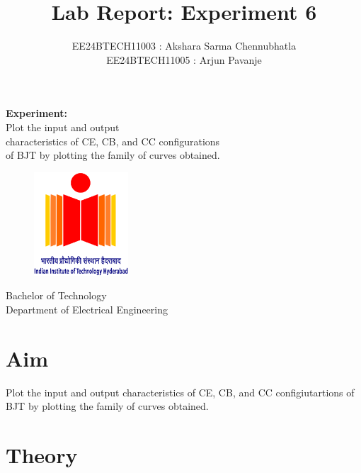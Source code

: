 \documentclass[12pt,a4paper]{article}
\title{\textbf{Lab Report: Experiment 6}}
\author{EE24BTECH11003 : Akshara Sarma Chennubhatla\\EE24BTECH11005 : Arjun Pavanje}
\begin{document}
\maketitle
\begin{center}
	\textbf{Experiment:\\}Plot the input and output\\ characteristics of CE, CB, and CC configurations\\ of BJT by plotting the family of curves obtained.
\end{center}
\vspace{30pt}
\begin{figure}[h!]
	\centering
	\includegraphics[width = 100pt]{logo.png}\\
\end{figure}
\begin{center}
	Bachelor of Technology\\
	\vspace{10pt}
	Department of Electrical Engineering\\
\end{center}
\newpage

\section{Aim}

Plot the input and output characteristics of CE, CB, and CC configiutartions of BJT by plotting the family of curves obtained.

\section{Theory}
\end{document}
